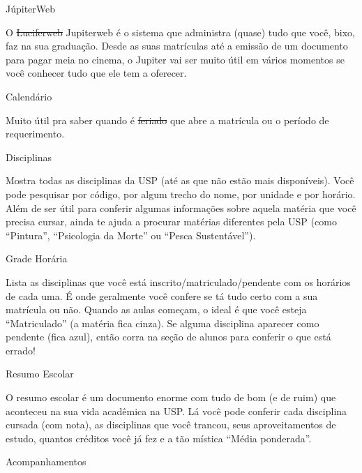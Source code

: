 \begin{secao}{JúpiterWeb}

O \sout{Luciferweb} Jupiterweb é o sistema que administra (quase) tudo que
você, bixo, faz na sua graduação. Desde as suas matrículas até a emissão de
um documento para pagar meia no cinema, o Jupiter vai ser muito útil em
vários momentos se você conhecer tudo que ele tem a oferecer.

\begin{subsecao}{Calendário}

Muito útil pra saber quando é \sout{feriado} que abre a matrícula ou o período
de requerimento.

\end{subsecao}

\begin{subsecao}{Disciplinas}

Mostra todas as disciplinas da USP (até as que não estão mais disponíveis).
Você pode pesquisar por código, por algum trecho do nome, por unidade e por
horário. Além de ser útil para conferir algumas informações sobre aquela
matéria que você precisa cursar, ainda te ajuda a procurar matérias diferentes
pela USP (como “Pintura”, “Psicologia da Morte” ou “Pesca Sustentável”).

\end{subsecao}

\begin{subsecao}{Grade Horária}

Lista as disciplinas que você está inscrito/matriculado/pendente com os
horários de cada uma. É onde geralmente você confere se tá tudo certo com a sua
matrícula ou não. Quando as aulas começam, o ideal é que você esteja
“Matriculado” (a matéria fica cinza). Se alguma disciplina aparecer como
pendente (fica azul), então corra na seção de alunos para conferir o que está
errado!

\end{subsecao}

\begin{subsecao}{Resumo Escolar}

O resumo escolar é um documento enorme com tudo de bom (e de ruim) que
aconteceu na sua vida acadêmica na USP. Lá você pode conferir cada disciplina
cursada (com nota), as disciplinas que você trancou, seus aproveitamentos de
estudo, quantos créditos você já fez e a tão mística “Média ponderada”.

\end{subsecao}

\begin{subsecao}{Acompanhamentos}


\end{subsecao}
\end{secao}
